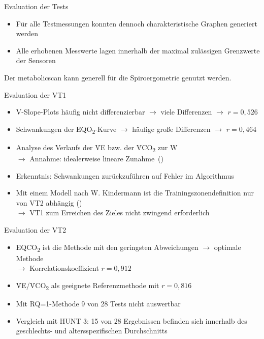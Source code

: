 \documentclass[colorBG,slideColor,8pt]{beamer}
\newcommand{\eqotwo}{EQO\textsubscript{2}}
\newcommand{\eqcotwo}{EQCO\textsubscript{2}}
\newcommand{\vcotwo}{\.{V}CO\textsubscript{2}}
\newcommand{\ve}{\.{V}E}
\begin{document}
\begin{frame}{Evaluation der Tests}
\begin{itemize}
	\item Für alle Testmessungen konnten dennoch charakteristische Graphen generiert werden
	\item Alle erhobenen Messwerte lagen innerhalb der maximal zulässigen Grenzwerte der Sensoren
\end{itemize}
\vspace{4ex}
\begin{center}
	Der metabolicscan kann generell für die Spiroergometrie genutzt werden.
\end{center}
\end{frame}

\begin{frame}{Evaluation der VT1}
\begin{itemize}
	\item V-Slope-Plots häufig nicht differenzierbar $\rightarrow$ viele Differenzen $\rightarrow$ $r = 0,526$
	\item Schwankungen der \eqotwo-Kurve $\rightarrow$ häufige große Differenzen $\rightarrow$ $r = 0,464$
	\item Analyse des Verlaufs der \ve{} bzw. der \vcotwo{} zur W\\$\rightarrow$ Annahme: idealerweise lineare Zunahme~(\cite{Ruehle.2012})
	\item Erkenntnis: Schwankungen zurückzuführen auf Fehler im Algorithmus
	\item Mit einem Modell nach W. Kindermann ist die Trainingszonendefinition nur von VT2 abhängig (\cite{Kindermann.2004})\\$\rightarrow$ VT1 zum Erreichen des Zieles nicht zwingend erforderlich
\end{itemize}
\end{frame}

\begin{frame}{Evaluation der VT2}
\begin{itemize}
	\item \eqcotwo{} ist die Methode mit den geringsten Abweichungen $\rightarrow$ optimale Methode\\$\rightarrow$ Korrelationskoeffizient $r = 0,912$
	\item \ve/\vcotwo{} als geeignete Referenzmethode mit $r = 0,816$
	\item Mit RQ=1-Methode 9 von 28 Tests nicht auswertbar
	\item Vergleich mit HUNT 3: 15 von 28 Ergebnissen befinden sich innerhalb des geschlechts- und altersspezifischen Durchschnitts
\end{itemize}
\end{frame}
\end{document}
